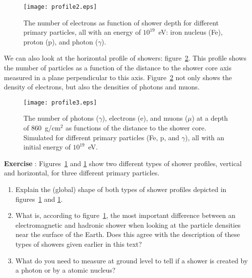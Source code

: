 \begin{figure}\begin{center}
\texttt{[image: profile2.eps]}%
\caption{The number of electrons as function of shower depth for different primary particles, all with an energy of $10^{19}$~eV: iron nucleus (Fe), proton (p), and photon ($\gamma$).}\label{fig:profile2}
\end{center}\end{figure}

We can also look at the horizontal profile of showers: figure~\ref{fig:profile3}. This profile shows the number of particles as a function of the distance to the shower core axis measured in a plane perpendicular to this axis. Figure~\ref{fig:profile3} not only shows the density of electrons, but also the densities of photons and muons. 

\begin{figure}\begin{center}
\texttt{[image: profile3.eps]}%
\caption{The number of photons ($\gamma$), electrons (e), and muons ($\mu$) at a depth of 860~g/cm$^2$ as functions of the distance to the shower core. Simulated for different primary particles (Fe, p, and $\gamma$), all with an initial energy of $10^{19}$~eV. }\label{fig:profile3}
\end{center}\end{figure}

\begin{shaded}
\textbf{Exercise \theExercise {}} : Figures~\ref{fig:profile2} and \ref{fig:profile2} show two different types of shower profiles, vertical and horizontal, for three different primary particles.
\begin{enumerate}[-]
\item Explain the (global) shape of both types of shower profiles depicted in figures~\ref{fig:profile2} and \ref{fig:profile2}.
\item What is, according to figure~\ref{fig:profile2}, the most important difference between an electromagnetic and hadronic shower when looking at the particle densities near the surface of the Earth. Does this agree with the description of these types of showers given earlier in this text?
\item What do you need to measure at ground level to tell if a shower is created by a photon or by a atomic nucleus?
\end{enumerate}\end{shaded}

